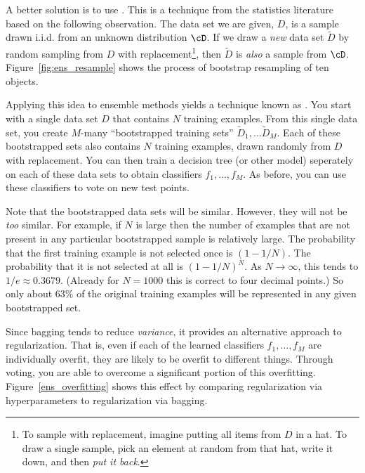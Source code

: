 

A better solution is to use .  This is a
technique from the statistics literature based on the following
observation.  The data set we are given, $D$, is a sample drawn
i.i.d. from an unknown distribution $\cD$.  If we draw a \emph{new}
data set $\tilde D$ by random sampling from $D$ with
replacement\footnote{To sample with replacement, imagine putting all
  items from $D$ in a hat.  To draw a single sample, pick an element
  at random from that hat, write it down, and then \emph{put it
    back}.}, then $\tilde D$ is \emph{also} a sample from $\cD$.
Figure~\ref{fig:ens_resample} shows the process of bootstrap
resampling of ten objects.

Applying this idea to ensemble methods yields a technique known as
.  You start with a single data set $D$ that contains
$N$ training examples.  From this single data set, you create $M$-many
``bootstrapped training sets'' $\tilde D_1, \dots \tilde D_M$.  Each
of these bootstrapped sets also contains $N$ training examples, drawn
randomly from $D$ with replacement.  You can then train a decision
tree (or other model) seperately on each of these data sets to obtain
classifiers $f_1, \dots, f_M$.  As before, you can use these
classifiers to vote on new test points.

Note that the bootstrapped data sets will be similar.  However, they
will not be \emph{too} similar.  For example, if $N$ is large then the
number of examples that are not present in any particular bootstrapped
sample is relatively large.  The probability that the first training
example is not selected once is $(1- 1/N)$.  The probability that it
is not selected at all is $(1 - 1/N)^N$.  As $N \rightarrow \infty$,
this tends to $1/e \approx 0.3679$.  (Already for $N=1000$ this is correct
to four decimal points.)  So only about $63\%$ of the original
training examples will be represented in any given bootstrapped set.


Since bagging tends to reduce \emph{variance}, it provides an
alternative approach to regularization.  That is, even if each of the
learned classifiers $f_1, \dots, f_M$ are individually overfit, they
are likely to be overfit to different things.  Through voting, you are
able to overcome a significant portion of this overfitting.
Figure~\ref{ens_overfitting} shows this effect by comparing
regularization via hyperparameters to regularization via bagging.

